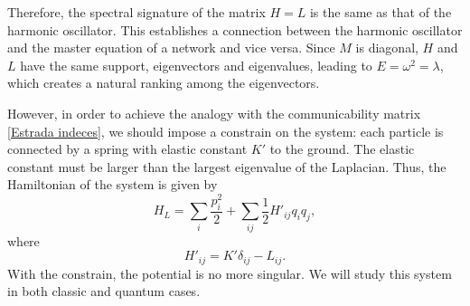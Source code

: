 Therefore, the spectral signature of the matrix $H = L$ is the same as that of the harmonic oscillator. This establishes a connection between the harmonic oscillator and the master equation of a network and vice versa. Since $M$ is diagonal, $H$ and $L$ have the same support, eigenvectors and eigenvalues, leading to $E = \omega^2 = \lambda$, which creates a natural ranking among the eigenvectors. 

However, in order to achieve the analogy with the communicability matrix \eqref{Estrada indeces}, we should impose a constrain on the system: each particle is connected by a spring with elastic constant $K'$ to the ground. The elastic constant must be larger than the largest eigenvalue of the Laplacian. 
Thus, the Hamiltonian of the system is given by
\begin{equation}\label{H_L}
    H_L = \sum_i \frac{p_i^2}{2} + \sum_{ij} \frac{1}{2}H'_{ij}q_iq_j,
\end{equation}
where
\begin{equation}\label{strange_potential}
    H'_{ij} = K'\delta_{ij} - L_{ij}.
\end{equation}
With the constrain, the potential is no more singular. We will study this system in both classic and quantum cases.



